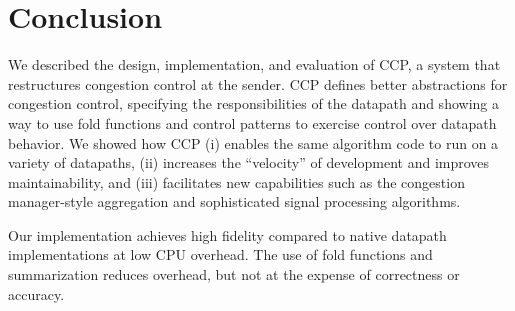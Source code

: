 \section{Conclusion}
\label{s:concl}

We described the design, implementation, and evaluation of CCP, a system that restructures congestion control at the sender. CCP defines better abstractions for congestion control, specifying the responsibilities of the datapath and showing a way to use fold functions and control patterns to exercise control over datapath behavior. We showed how CCP (i) enables the same algorithm code to run on a variety of datapaths, (ii) increases the ``velocity'' of development and improves maintainability, and (iii) facilitates new capabilities such as the congestion manager-style aggregation and sophisticated signal processing algorithms. 

Our implementation achieves high fidelity compared to native datapath implementations at low CPU overhead. The use of fold functions and summarization reduces overhead, but not at the expense of correctness or accuracy.
